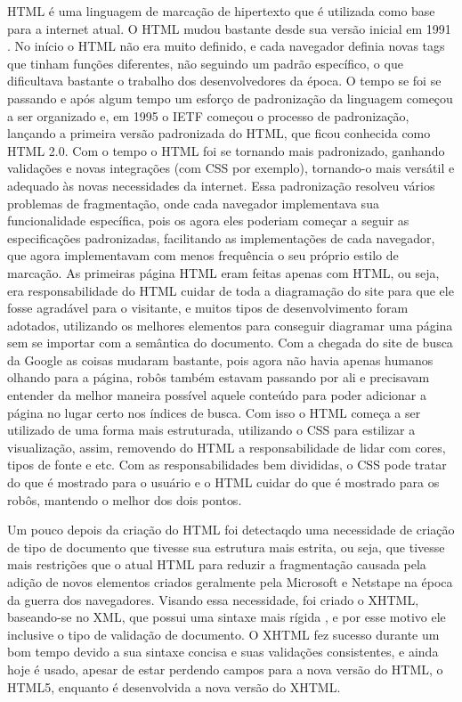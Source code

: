 HTML é uma linguagem de marcação de hipertexto que é utilizada como base para a internet
atual. O HTML mudou bastante desde sua versão inicial em 1991 \cite{powell2003html}.
No início o HTML não era muito definido, e cada
navegador definia novas tags que tinham funções diferentes,
não seguindo um padrão específico, o que dificultava
bastante o trabalho dos desenvolvedores da época.
O tempo se foi se passando e após algum tempo um esforço de padronização da linguagem
começou a ser organizado e, em 1995 o IETF começou o processo de
padronização, lançando a primeira versão padronizada do HTML, que ficou conhecida como HTML 2.0.
Com o tempo o HTML foi se tornando mais padronizado, ganhando validações e novas integrações
(com CSS por exemplo), tornando-o mais versátil e adequado às novas necessidades da
internet.
Essa padronização resolveu vários problemas de fragmentação, onde cada
navegador implementava sua funcionalidade específica, pois os agora
eles poderiam começar a seguir as especificações padronizadas,
facilitando as implementações de cada navegador, que agora implementavam com
menos frequência o seu próprio estilo de marcação.
As primeiras página HTML eram feitas apenas com HTML, ou seja, era
responsabilidade do HTML cuidar de toda a diagramação do site para que
ele fosse agradável para o visitante, e muitos tipos de
desenvolvimento foram adotados, utilizando os melhores elementos para
conseguir diagramar uma página sem se importar com a semântica do
documento. Com a chegada do site de busca da Google as coisas mudaram bastante, pois
agora não havia apenas humanos olhando para a página, robôs também
estavam passando por ali e precisavam entender da melhor maneira
possível aquele conteúdo para poder adicionar a página no lugar certo
nos índices de busca. Com isso o HTML começa a ser utilizado de uma
forma mais estruturada, utilizando o CSS para estilizar a visualização,
assim, removendo do HTML a responsabilidade de lidar com cores, tipos de
fonte e etc. Com as responsabilidades bem divididas, o CSS pode tratar
do que é mostrado para o usuário e o HTML cuidar do que é mostrado
para os robôs, mantendo o melhor dos dois pontos.

Um pouco depois da criação do HTML foi detectaqdo uma necessidade de
criação de tipo de documento que tivesse sua estrutura mais estrita,
ou seja, que tivesse mais restrições que o atual HTML para reduzir a
fragmentação causada pela adição de novos elementos criados geralmente
pela Microsoft e Netstape na época da guerra dos navegadores. Visando
essa necessidade, foi criado o XHTML, baseando-se no XML, que
possui uma sintaxe mais rígida \cite{ray2003learning}, e por esse
motivo ele inclusive o tipo de validação de documento.
O XHTML fez sucesso durante um bom tempo devido a sua sintaxe concisa e
suas validações consistentes, e ainda hoje é usado, apesar de estar
perdendo campos para a nova versão do HTML, o HTML5, enquanto é
desenvolvida a nova versão do XHTML.


